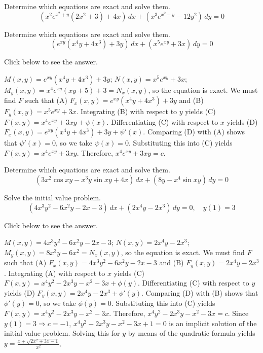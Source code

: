 \documentclass{ximera}
\begin{document}
\begin{problem}\label{exer:2.5.15} Determine which equations are exact and solve them.
$$\left(x^2e^{x^2+y}(2x^2+3)+4x\right)\,dx+(x^3e^{x^2+y}-12y^2)\,dy=0$$
\end{problem}

\begin{problem}\label{exer:2.5.16} Determine which equations are exact and solve them.
$$\left(e^{xy}(x^4y+4x^3)+3y\right)\,dx+(x^5e^{xy}+3x)\,dy=0$$

Click below to see the answer.

\begin{expandable}
    $M(x,y)=e^{xy}(x^4y+4x^3)+3y$;\;
$N(x,y)=x^5e^{xy}+3x$;\;
$M_y(x,y)=x^4e^{xy}(xy+5)+3=N_x(x,y)$,
so the  equation is  exact.
We must find $F$ such that
(A) $F_x(x,y)=e^{xy}(x^4y+4x^3)+3y$ and
(B) $F_y(x,y)=x^5e^{xy}+3x$.
Integrating (B) with respect to $y$ yields
(C) $F(x,y)=x^4e^{xy}+3xy+\psi(x)$.
Differentiating (C) with respect to $x$  yields
(D) $F_x(x,y)=e^{xy}(x^4y+4x^3)+3y+\psi'(x)$.
Comparing (D) with (A)  shows that
$\psi'(x)=0$, so we take
$\psi(x)=0$.
Substituting this into (C) yields
$F(x,y)=x^4e^{xy}+3xy$.
Therefore,  $x^4e^{xy}+3xy=c$.
\end{expandable}
\end{problem}

\begin{problem}\label{exer:2.5.17} Determine which equations are exact and solve them.
$$(3x^2\cos xy-x^3y\sin xy+4x)\,dx+(8y-x^4\sin xy)\,dy=0$$
\end{problem}

\begin{problem}\label{exer:2.5.18} Solve the initial value problem.
$$(4x^3y^2-6x^2y-2x-3)\,dx+(2x^4y-2x^3)\,dy=0,\quad y(1)=3$$

Click below to see the answer.

\begin{expandable}
    $M(x,y)=4x^3y^2-6x^2y-2x-3$;\;
$N(x,y)=2x^4y-2x^3$;\;
$M_y(x,y)=8x^3y-6x^2=N_x(x,y)$,
so the  equation is exact.
We must find $F$ such that
(A) $F_x(x,y)=4x^3y^2-6x^2y-2x-3$ and
(B) $F_y(x,y)=2x^4y-2x^3$.
Integrating (A) with respect to $x$ yields
(C) $F(x,y)=x^4y^2-2x^3y-x^2-3x+\phi(y)$.
Differentiating (C) with respect to $y$  yields
(D) $F_y(x,y)=2x^4y-2x^3+\phi'(y)$.
Comparing (D) with (B)  shows that
$\phi'(y)=0$, so we take
$\phi(y)=0$.
Substituting this into (C) yields
$F(x,y)=x^4y^2-2x^3y-x^2-3x$.
Therefore, $x^4y^2-2x^3y-x^2-3x=c$.
Since $y(1)=3\Rightarrow c=-1$,
$x^4y^2-2x^3y-x^2-3x+1=0$ is an implicit solution of the initial
value problem. Solving this for $y$ by means of the quadratic formula
yields $y=\frac{x+\sqrt{2x^2+3x-1}}{x^2}$.
\end{expandable}
\end{problem}
\end{document}
